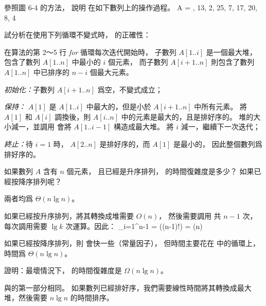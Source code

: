 \startsection[
  title={The heapsort algorithm},
]

\startEXERCISE
參照圖 6-4 的方法，
說明  在如下數列上的操作過程。
\startformula
A = , 13, 2, 25, 7, 17, 20, 8, 4 \rangle
\stopformula
\stopEXERCISE

\startANSWER
\startcombination[4*3]
{\externalfigure[output/e6_4_1-1]}{}
{\externalfigure[output/e6_4_1-2]}{}
{\externalfigure[output/e6_4_1-3]}{}
{\externalfigure[output/e6_4_1-4]}{}
{\externalfigure[output/e6_4_1-5]}{}
{\externalfigure[output/e6_4_1-6]}{}
{\externalfigure[output/e6_4_1-7]}{}
{\externalfigure[output/e6_4_1-8]}{}
{\externalfigure[output/e6_4_1-9]}{}
\stopcombination
\stopANSWER

\startEXERCISE
試分析在使用下列循環不變式時，  的正確性：

在算法的第 2～5 行 \emph{for} 循環每次迭代開始時，
子數列 $A[1..i]$ 是一個最大堆，包含了數列 $A[1..n]$ 中最小的 $i$ 個元素，
而子數列 $A[i+1..n]$ 則包含了數列 $A[1..n]$ 中已排序的 $n-i$ 個最大元素。
\stopEXERCISE

\startANSWER
\emph{初始化：}子數列 $A[i+1..n]$ 爲空，不變式成立；

\emph{保持：} $A[1]$ 是 $A[1..i]$ 中最大的，但是小於 $A[i+1..n]$ 中所有元素。
將 $A[1]$ 和 $A[i]$ 調換後，則 $A[i..n]$ 中的元素是最大的，且是排好序的。
堆的大小減一，並調用  會將 $A[1..i-1]$ 構造成最大堆。
將 $i$ 減一，繼續下一次迭代；

\emph{終止：}待 $i=1$ 時， $A[2..n]$ 是排好序的，而 $A[1]$ 是最小的，
因此整個數列爲排好序的。
\stopANSWER

如果數列 $A$ 含有 $n$ 個元素，
且已經是升序排列，  的時間復雜度是多少？
如果已經按降序排列呢？
\stopEXERCISE

\startANSWER
兩者均爲 $\Theta(n\lg{n})$。

如果已經按升序排列，將其轉換成堆需要 $O(n)$，
然後需要調用  共 $n-1$ 次，
每次調用需要 $\lg{k}$ 次運算。因此：
\startformula
\sum_{i=1}^{n-1} = \lg((n-1)!) = \Theta(n)
\stopformula

如果已經按降序排列，則  會快一些（常量因子），
但時間主要花在  中的循環上，時間爲 $\Theta(n\lg{n})$。
\stopANSWER

\startEXERCISE
證明：最壞情況下，  的時間復雜度是 $\Omega(n\lg{n})$。
\stopEXERCISE

\startANSWER
與的第一部分相同。
如果數列已經排好序，我們需要線性時間將其轉換成最大堆，然後需要 $n\lg{n}$ 的時間排序。
\stopANSWER

